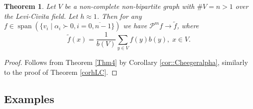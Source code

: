 \documentclass[a4paper,12pt]{amsart}
\newtheorem{theorem}{Theorem}
\theoremstyle{definition}
\DeclareMathOperator\lspan{span}
\renewcommand{\P}{\mathcal{P}}
\newcommand{\weight}{b}
\begin{document}
\begin{theorem}\label{corhLC1}
Let $V$ be a non-complete non-bipartite graph with $\#V=n>1$ over the Levi-Civita field. Let $h\approx 1$. Then for any $f\in \lspan(\{v_i \mid \alpha_i\succ 0, i=\overline{0,n-1}\})$ we have $\P^{m} f\to \widetilde f$, where 
\begin{equation*}
\widetilde f(x)=\dfrac{1}{\weight (V)}\sum_{y\in V} f(y)\weight (y),\; x\in V.
\end{equation*}
\end{theorem}
\begin{proof}
Follows from Theorem \ref{Thm4} by Corollary \ref{cor::Cheegeralpha}, similarly to the proof of Theorem \ref{corhLC}.
\end{proof}

\subsection{Examples}
\end{document}
